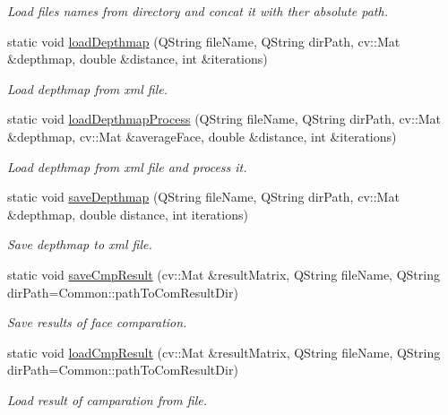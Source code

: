 \begin{DoxyCompactItemize}
\begin{DoxyCompactList}\small\item\em Load files names from directory and concat it with ther absolute path. \end{DoxyCompactList}\item 
static void \hyperlink{class_common_a64a7495b0b24a83e20616d93466d4ee4}{load\+Depthmap} (Q\+String file\+Name, Q\+String dir\+Path, cv\+::\+Mat \&depthmap, double \&distance, int \&iterations)
\begin{DoxyCompactList}\small\item\em Load depthmap from xml file. \end{DoxyCompactList}\item 
static void \hyperlink{class_common_adcc451f04f86fef2678c6b2a43721459}{load\+Depthmap\+Process} (Q\+String file\+Name, Q\+String dir\+Path, cv\+::\+Mat \&depthmap, cv\+::\+Mat \&average\+Face, double \&distance, int \&iterations)
\begin{DoxyCompactList}\small\item\em Load depthmap from xml file and process it. \end{DoxyCompactList}\item 
static void \hyperlink{class_common_afd21f637aeada98fd144b0c069580219}{save\+Depthmap} (Q\+String file\+Name, Q\+String dir\+Path, cv\+::\+Mat \&depthmap, double distance, int iterations)
\begin{DoxyCompactList}\small\item\em Save depthmap to xml file. \end{DoxyCompactList}\item 
static void \hyperlink{class_common_a32e84e2c267fc1d9c01b85ae10a3dba8}{save\+Cmp\+Result} (cv\+::\+Mat \&result\+Matrix, Q\+String file\+Name, Q\+String dir\+Path=Common\+::path\+To\+Com\+Result\+Dir)
\begin{DoxyCompactList}\small\item\em Save results of face comparation. \end{DoxyCompactList}\item 
static void \hyperlink{class_common_a147ec8d7fe31ae85bbbca82c27a8a1cd}{load\+Cmp\+Result} (cv\+::\+Mat \&result\+Matrix, Q\+String file\+Name, Q\+String dir\+Path=Common\+::path\+To\+Com\+Result\+Dir)
\begin{DoxyCompactList}\small\item\em Load result of camparation from file. \end{DoxyCompactList}\item 

\end{DoxyCompactItemize}
